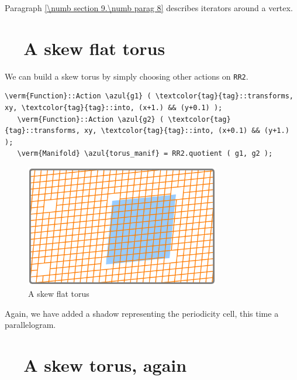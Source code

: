 Paragraph \ref{\numb section 9.\numb parag 8} describes iterators around a vertex.


\section{~~A skew flat torus}\label{\numb section 7.\numb parag 7}

We can build a skew torus by simply choosing other actions on {\small\tt RR2}.

\begin{Verbatim}[commandchars=\\\{\},formatcom=\small\tt,frame=single,
   label=parag-\ref{\numb section 7.\numb parag 7}.cpp,rulecolor=\color{coment},
   baselinestretch=0.94,framesep=2mm                                            ]
   \verm{Function}::Action \azul{g1} ( \textcolor{tag}{tag}::transforms, xy, \textcolor{tag}{tag}::into, (x+1.) && (y+0.1) );
   \verm{Function}::Action \azul{g2} ( \textcolor{tag}{tag}::transforms, xy, \textcolor{tag}{tag}::into, (x+0.1) && (y+1.) );
   \verm{Manifold} \azul{torus_manif} = RR2.quotient ( g1, g2 );
\end{Verbatim}

\begin{figure}[ht] \centering
  \includegraphics[width=85mm]{flat-torus-3.eps}
  \caption{A skew flat torus}
  \label{\numb section 7.\numb fig 3}
\end{figure}

Again, we have added a shadow representing the periodicity cell, this time a parallelogram.


\section{~~A skew torus, again}\label{\numb section 7.\numb parag 8}

